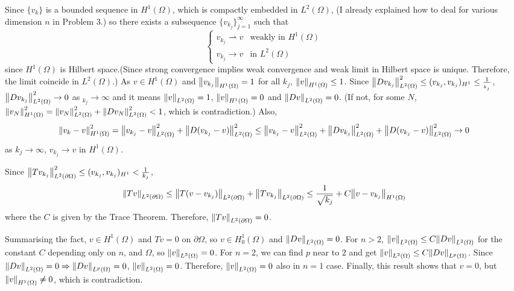 \documentclass{article}
\begin{document}
\begin{enumerate}
\begin{enumerate}
Since $\{v_k\}$ is a bounded sequence in $H^1(\Omega)$, which is compactly embedded in $L^2(\Omega)$, (I already explained how to deal for various dimension $n$ in Problem 3.) so there exists a subsequence $\{v_{k_j}\}_{j=1}^\infty$ such that 
\begin{equation*}
\begin{cases}
v_{k_j}\rightharpoonup v & \text{weakly in }H^1(\Omega) \\
v_{k_j}\rightarrow v & \text{in }L^2(\Omega)
\end{cases}
\end{equation*}
since $H^1(\Omega)$ is Hilbert space.(Since strong convergence implies weak convergence and weak limit in Hilbert space is unique. Therefore, the limit coincide in $L^2(\Omega)$.) As $v\in H^1(\Omega)$ and $\norm{v_{k_j}}_{H^1(\Omega)}=1$ for all $k_j$, $\norm{v}_{H^1(\Omega)}\leq 1$. Since $\norm{Dv_{k_j}}^2_{L^2(\Omega)}\leq (v_{k_j},v_{k_j})_{H^1}\leq \frac{1}{_{k_j}}$, $\norm{Dv_{k_j}}^2_{L^2(\Omega)}\rightarrow 0$ as $_{k_j}\rightarrow \infty$ and it means $\norm{v}_{L^2(\Omega)}=1$, $\norm{v}_{H^1(\Omega)}=0$ and $\norm{Dv}_{L^2(\Omega)}=0$. (If not, for some $N$, $\norm{v_N}^2_{H^1(\Omega)}=\norm{v_N}^2_{L^2(\Omega)}+\norm{Dv_N}^2_{L^2(\Omega)}<1$, which is contradiction.) Also,
\begin{equation*}
\norm{v_k-v}^2_{H^1(\Omega)}=\norm{v_{k_j}-v}^2_{L^2(\Omega)}+\norm{D(v_{k_j}-v)}^2_{L^2(\Omega)}\leq \norm{v_{k_j}-v}^2_{L^2(\Omega)}+\norm{Dv_{k_j}}^2_{L^2(\Omega)}+\norm{D(v_{k_j}-v)}^2_{L^2(\Omega)}\rightarrow 0
\end{equation*}
as ${k_j}\rightarrow \infty$, $v_{k_j}\rightarrow v$ in $H^1(\Omega)$.

Since $\norm{Tv_{k_j}}^2_{L^2(\partial \Omega)}\leq (v_{k_j},v_{k_j})_{H^1}<\frac{1}{k_j}$,
\begin{equation*}
\norm{Tv}_{L^2(\partial \Omega)}\leq \norm{T(v-v_{k_j})}_{L^2(\partial \Omega)}+\norm{Tv_{k_j}}_{L^2(\partial \Omega)}\leq \frac{1}{\sqrt{k_j}}+C\norm{v-v_{k_j}}_{H^1(\Omega)}
\end{equation*}
where the $C$ is given by the Trace Theorem. Therefore, $\norm{Tv}_{L^2(\partial \Omega)}=0$.

Summarising the fact, $v\in H^1(\Omega)$ and $Tv=0$ on $\partial \Omega$, so $v\in H^1_0(\Omega)$ and $\norm{Dv}_{L^2(\Omega)}=0$. For $n>2$, $\norm{v}_{L^2(\Omega)}\leq C\norm{Dv}_{L^2(\Omega)}$ for the constant $C$ depending only on $n$, and $\Omega$, so $\norm{v}_{L^2(\Omega)}=0$. For $n=2$, we can find $p$ near to $2$ and get $\norm{v}_{L^2(\Omega)}\leq C\norm{Dv}_{L^p(\Omega)}$. Since $\norm{Dv}_{L^2(\Omega)}=0\Rightarrow \norm{Dv}_{L^p(\Omega)}=0$, $\norm{v}_{L^2(\Omega)}=0$. Therefore, $\norm{v}_{L^2(\Omega)}=0$ also in $n=1$ case. Finally, this result shows that $v=0$, but $\norm{v}_{H^1(\Omega)}\neq 0$, which is contradiction.


\end{enumerate}
\end{enumerate}
\end{document}
